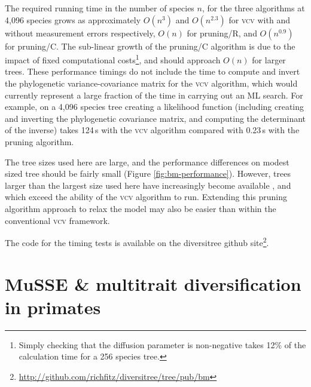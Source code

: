 \documentclass[12pt,twoside]{article}
\begin{document}
The required running time in the number of species $n$, for the three
algorithms at 4,096 species grows as approximately $O(n^3)$ and
$O(n^{2.3})$ for \textsc{vcv} with and without measurement errors
respectively, $O(n)$ for pruning/R, and $O(n^{0.9})$ for pruning/C.
The sub-linear growth of the pruning/C algorithm is due to the impact
of fixed computational costs\footnote{Simply checking that the
  diffusion parameter is non-negative takes 12\% of the calculation
  time for a 256 species tree.}, and should approach $O(n)$ for larger
trees.
%
These performance timings do not include the time to compute and
invert the phylogenetic variance-covariance matrix for the
\textsc{vcv} algorithm, which would currently represent a large
fraction of the time in carrying out an ML search.  For example, on a
4,096 species tree creating a likelihood function (including creating
and inverting the phylogenetic covariance matrix, and computing the
determinant of the inverse) takes 124\,s with the \textsc{vcv}
algorithm compared with 0.23\,s with the pruning algorithm.

The tree sizes used here are large, and the performance differences on
modest sized tree should be fairly small (Figure
\ref{fig:bm-performance}).  However, trees larger than the largest
size used here have increasingly become available
\citep[e.g.,][]{Bininda-Emonds-2007-507,Smith-2008-86}, and which
exceed the ability of the \textsc{vcv} algorithm to run.  Extending
this pruning algorithm approach to relax the model may also be easier
than within the conventional \textsc{vcv} framework.

The code for the timing tests is available on the diversitree github
site\footnote{\url{http://github.com/richfitz/diversitree/tree/pub/bm}}.

\clearpage
\section{MuSSE \& multitrait diversification in primates}
\label{sec:primates}


\clearpage


\end{document}

